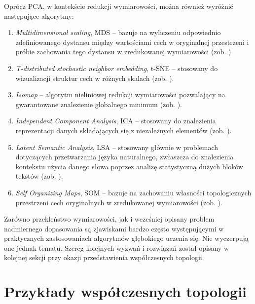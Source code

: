 Oprócz PCA, w kontekście redukcji wymiarowości, można również wyróżnić następujące algorytmy: 
\begin{enumerate}
	\item \textit{Multidimensional scaling}, MDS -- bazuje na wyliczeniu odpowiednio zdefiniowanego dystansu między wartościami cech w oryginalnej przestrzeni i próbie zachowania tego dystansu w zredukowanej wymiarowości (zob. \cite{Chen:2008:HDV:1370965}).
	\item \textit{T-distributed stochastic neighbor embedding}, t-SNE -- stosowany do wizualizacji struktur cech w różnych skalach (zob. \cite{vanDerMaaten2008}).
	\item \textit{Isomap} -- algorytm nieliniowej redukcji wymiarowości pozwalający na gwarantowane znalezienie globalnego minimum (zob. \cite{tenenbaum_global_2000}). 
	\item \textit{Independent Component Analysis}, ICA -- stosowany do znalezienia reprezentacji danych składających się z niezależnych elementów (zob. \cite{ICA}).
	\item \textit{Latent Semantic Analysis}, LSA -- stosowany głównie w problemach dotyczących przetwarzania języka naturalnego, zwłaszcza do znalezienia kontekstu użycia danego słowa poprzez analizę statystyczną dużych bloków tekstów (zob. \cite{Wolfe2003}). 
	\item \textit{Self Organizing Maps}, SOM --  bazuje na zachowaniu własności topologicznych przestrzeni cech oryginalnych w zredukowanej wymiarowości (zob. \cite{Vesanto00self-organizingmap}).
\end{enumerate}

Zarówno przekleństwo wymiarowości, jak i wcześniej opisany problem nadmiernego dopasowania są zjawiskami bardzo często występującymi w praktycznych zastosowaniach algorytmów głębokiego uczenia się. Nie wyczerpują one jednak tematu. Szereg kolejnych wyzwań i rozwiązań został opisany w kolejnej sekcji przy okazji przedstawienia współczesnych topologii.

\section{Przykłady współczesnych topologii}

